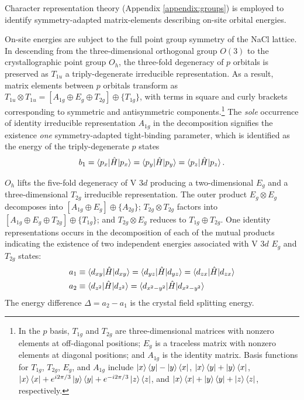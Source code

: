 \documentclass[twocolumn,showpacs,preprintnumbers,superscriptaddress,prb,floatfix,aps,10pt]{revtex4-1}
\newcommand*{\ham}{\hat{H}}
\begin{document}
Character representation theory (Appendix \ref{appendix:groups}) is employed to identify symmetry-adapted matrix-elements describing on-site orbital energies. 

On-site energies are subject to the full point group symmetry of the NaCl lattice. In descending from the three-dimensional orthogonal group $O(3)$ to the crystallographic point group $O_h$, the three-fold degeneracy of $p$ orbitals is preserved as $T_{1u}$ a triply-degenerate irreducible representation. As a result, matrix elements between $p$ orbitals transform as $T_{1u} \otimes T_{1u} = [A_{1g} \oplus E_g \oplus T_{2g}] \oplus \{T_{1g}\}$, with terms in square and curly brackets corresponding to symmetric and antisymmetric components.\footnote{In the $p$ basis, $T_{1g}$ and $T_{2g}$ are three-dimensional matrices with nonzero elements at off-diagonal positions; $E_g$ is a traceless matrix with nonzero elements at diagonal positions; and $A_{1g}$ is the identity matrix. Basis functions for $T_{1g}$, $T_{2g}$, $E_g$, and $A_{1g}$ include $\ket{x}\bra{y} - \ket{y}\bra{x}$, $\ket{x}\bra{y} + \ket{y}\bra{x}$, $\ket{x}\bra{x} + e^{i2\pi/3}\ket{y}\bra{y} + e^{-i2\pi/3}\ket{z}\bra{z}$, and $\ket{x}\bra{x} + \ket{y}\bra{y} + \ket{z}\bra{z}$, respectively.} The \emph{sole} occurrence of identity irreducible representation $A_{1g}$ in the decomposition signifies the existence \emph{one} symmetry-adapted tight-binding parameter, which is identified as the energy of the triply-degenerate $p$ states
%
\begin{align}
\begin{split}
b_1=\braket{p_x|\ham|p_x}=\braket{p_y|\ham|p_y}=\braket{p_z|\ham|p_z}.
\end{split}
\end{align}
%

$O_h$ lifts the five-fold degeneracy of V 3$d$ producing a two-dimensional $E_g$ and a three-dimensional $T_{2g}$ irreducible representation. The outer product $E_g \otimes E_g$ decomposes into $[A_{1g} \oplus E_g] \oplus \{A_{2g}\}$; $T_{2g} \otimes T_{2g}$ factors into $[A_{1g} \oplus E_{g} \oplus T_{2g}] \oplus \{T_{1g}\}$; and $T_{2g} \otimes E_g$ reduces to $T_{1g} \oplus T_{2g}$. One identity representations occurs in the decomposition of each of the mutual products indicating the existence of two independent energies associated with V 3$d$ $E_g$ and $T_{2g}$ states:
%
\begin{align}
\begin{split}
a_1&\equiv\braket{d_{xy}|\ham|d_{xy}}=\braket{d_{yz}|\ham|d_{yz}}=\braket{d_{zx}|\ham|d_{zx}}\\
a_2&\equiv\braket{d_{z^2}|\ham|d_{z^2}}=\braket{d_{x^2-y^2}|\ham|d_{x^2-y^2}}\\
\end{split}
\end{align}
%
The energy difference $\Delta = a_2 - a_1$ is the crystal field splitting energy. 
\end{document}
